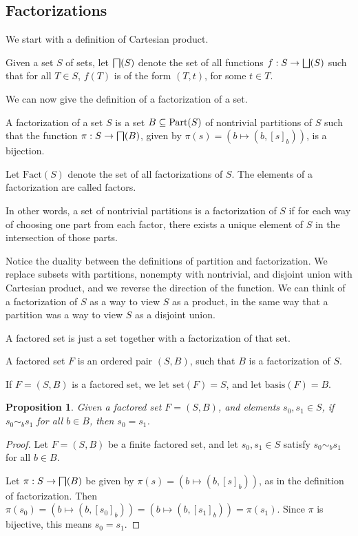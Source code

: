 \documentclass[authordate,onecolumn]{miri-tech-article}
\newtheorem{proposition}{Proposition}
\begin{document}
\subsection{Factorizations}
We start with a definition of Cartesian product.
\begin{definition}\label{proddef}
Given a set $S$ of sets, let $\bigsqcap(S)$ denote the set of all functions $f:S\rightarrow \bigsqcup(S)$ such that for all $T\in S$, $f(T)$ is of the form $(T,t)$, for some $t\in T$.
\end{definition}
We can now give the definition of a factorization of a set.
\begin{definition}[factorization]
A factorization of a set $S$ is a set $B\subseteq\text{Part}(S)$ of nontrivial partitions of $S$ such that the function $\pi:S\rightarrow\bigsqcap(B)$, given by $\pi(s)=(b\mapsto(b,[s]_b))$, is a bijection.

Let $\text{Fact}(S)$ denote the set of all factorizations of $S$. The elements of a factorization are called factors.
\end{definition}
In other words, a set of nontrivial partitions is a factorization of $S$ if for each way of choosing one part from each factor, there exists a unique element of $S$ in the intersection of those parts.

Notice the duality between the definitions of partition and factorization. We replace subsets with partitions, nonempty with nontrivial, and disjoint union with Cartesian product, and we reverse the direction of the function. We can think of a factorization of $S$ as a way to view $S$ as a product, in the same way that a partition was a way to view $S$ as a disjoint union.

A factored set is just a set together with a factorization of that set.
\begin{definition}
A factored set $F$ is an ordered pair $(S,B)$, such that $B$ is a factorization of $S$. 

If $F=(S,B)$ is a factored set, we let $\text{set}(F)=S$, and let $\text{basis}(F)=B$.
\end{definition}

\begin{proposition}\label{templabel1}
Given a factored set $F=(S,B)$, and elements $s_0,s_1\in S$, if $s_0\sim_b s_1$ for all $b\in B$, then $s_0=s_1$.

\end{proposition}
\begin{proof}
Let $F=(S,B)$ be a finite factored set, and let $s_0,s_1\in S$ satisfy $s_0\sim_b s_1$ for all $b\in B$. 

Let $\pi:S\rightarrow \bigsqcap(B)$ be given by $\pi(s)=(b\mapsto(b,[s]_b))$, as in the definition of factorization. Then $\pi(s_0)=(b\mapsto(b,[s_0]_b))=(b\mapsto(b,[s_1]_b))=\pi(s_1)$. Since $\pi$ is bijective, this means $s_0=s_1$.
\end{proof}
\end{document}
